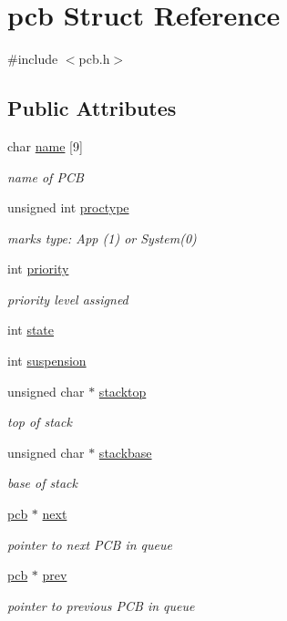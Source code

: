 \hypertarget{structpcb}{}\section{pcb Struct Reference}
\label{structpcb}


{\ttfamily \#include $<$pcb.\+h$>$}

\subsection*{Public Attributes}
\begin{DoxyCompactItemize}
\item 
char \hyperlink{structpcb_a360b3d707c6418dc8008771f43196964}{name} \mbox{[}9\mbox{]}
\begin{DoxyCompactList}\small\item\em name of P\+C\+B \end{DoxyCompactList}\item 
unsigned int \hyperlink{structpcb_ae911612e25b572ed39b43d31a8671b4b}{proctype}
\begin{DoxyCompactList}\small\item\em marks type\+: App (1) or System(0) \end{DoxyCompactList}\item 
int \hyperlink{structpcb_a1850f2ea7807c7368c02f0062bfa33ca}{priority}
\begin{DoxyCompactList}\small\item\em priority level assigned \end{DoxyCompactList}\item 
int \hyperlink{structpcb_ab97f8ca3e24782ed25b0cb4f21c351dc}{state}
\item 
int \hyperlink{structpcb_a76bef8d53d5c9a9d330a0f2933795289}{suspension}
\item 
unsigned char $\ast$ \hyperlink{structpcb_a625a19ac788246815a5cd923d9ca4db0}{stacktop}
\begin{DoxyCompactList}\small\item\em top of stack \end{DoxyCompactList}\item 
unsigned char $\ast$ \hyperlink{structpcb_abc1b0e6ef9a587d2cdf18456c9197df8}{stackbase}
\begin{DoxyCompactList}\small\item\em base of stack \end{DoxyCompactList}\item 
\hyperlink{structpcb}{pcb} $\ast$ \hyperlink{structpcb_a4c8a53ac3e0acb802d447066865a22f7}{next}
\begin{DoxyCompactList}\small\item\em pointer to next P\+C\+B in queue \end{DoxyCompactList}\item 
\hyperlink{structpcb}{pcb} $\ast$ \hyperlink{structpcb_a2d692e41a254446edf9a1d2d0a5a18de}{prev}
\begin{DoxyCompactList}\small\item\em pointer to previous P\+C\+B in queue \end{DoxyCompactList}\end{DoxyCompactItemize}



